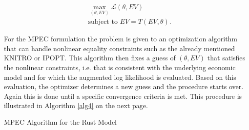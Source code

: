 \begin{equation}
\begin{aligned}
& \max_{(\theta, EV)} \mathcal{L}(\theta, EV) \\
& \text{subject to } EV = T(EV, \theta).
\end{aligned}
\label{eq2}
\end{equation}

For the MPEC formulation the problem is given to an optimization algorithm that can handle nonlinear equality constraints such as the already mentioned KNITRO or IPOPT. This algorithm then fixes a guess of $(\theta, EV)$ that satisfies the nonlinear constraints, i.e. that is consistent with the underlying economic model and for which the augmented log likelihood is evaluated. Based on this evaluation, the optimizer determines a new guess and the procedure starts over. Again this is done until a specific convergence criteria is met. This procedure is illustrated in Algorithm \ref{alg4} on the next page.


\vspace{2ex}
\begin{algorithm}[!h]
	\caption{MPEC Algorithm for the Rust Model}
	\label{alg4}
	\SetAlgoLined
\end{algorithm}
\vspace{2ex}

